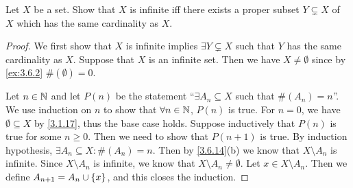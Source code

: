 \exercisesection

\begin{ex}\label{ex:8.1.1}
	Let \(X\) be a set.
	Show that \(X\) is infinite iff there exists a proper subset \(Y \subsetneq X\) of \(X\) which has the same cardinality as \(X\).
\end{ex}

\begin{proof}
	We first show that \(X\) is infinite implies \(\exists Y \subsetneq X\) such that \(Y\) has the same cardinality as \(X\).
	Suppose that \(X\) is an infinite set.
	Then we have \(X \neq \emptyset\) since by \cref{ex:3.6.2} \(\#(\emptyset) = 0\).

	Let \(n \in \mathbb{N}\) and let \(P(n)\) be the statement ``\(\exists A_n \subseteq X\) such that \(\#(A_n) = n\)''.
	We use induction on \(n\) to show that \(\forall n \in \mathbb{N}\), \(P(n)\) is true.
	For \(n = 0\), we have \(\emptyset \subseteq X\) by \cref{3.1.17}, thus the base case holds.
	Suppose inductively that \(P(n)\) is true for some \(n \geq 0\).
	Then we need to show that \(P(n + 1)\) is true.
	By induction hypothesis, \(\exists A_n \subseteq X : \#(A_n) = n\).
	Then by \cref{3.6.14}(b) we know that \(X \setminus A_n\) is infinite.
	Since \(X \setminus A_n\) is infinite, we know that \(X \setminus A_n \neq \emptyset\).
	Let \(x \in X \setminus A_n\).
	Then we define \(A_{n + 1} = A_n \cup \left\lbrace x\right\rbrace\), and this closes the induction.


\end{proof}
